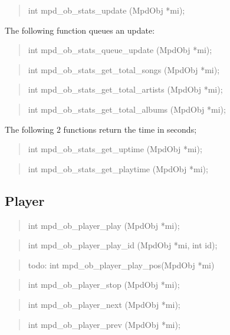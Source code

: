 \documentclass[a4paper,11pt]{article}
\begin{document}
\begin{quote}
int		mpd\_ob\_stats\_update			(MpdObj *mi);
\end{quote}

The following function queues an update:
\begin{quote}
int		mpd\_ob\_stats\_queue\_update		(MpdObj *mi);
\end{quote}

\begin{quote}
int		mpd\_ob\_stats\_get\_total\_songs		(MpdObj *mi);
\end{quote}

\begin{quote}
int		mpd\_ob\_stats\_get\_total\_artists		(MpdObj *mi);
\end{quote}

\begin{quote}
int		mpd\_ob\_stats\_get\_total\_albums		(MpdObj *mi);
\end{quote}

The following 2 functions return the time in seconds;
\begin{quote}
int		mpd\_ob\_stats\_get\_uptime			(MpdObj *mi);
\end{quote}
\begin{quote}
int		mpd\_ob\_stats\_get\_playtime		(MpdObj *mi);
\end{quote}

\subsection{Player}
\begin{quote}
int 		mpd\_ob\_player\_play			(MpdObj *mi);
\end{quote}
\begin{quote}
int 		mpd\_ob\_player\_play\_id			(MpdObj *mi, int id);
\end{quote}

\begin{quote}
todo: int mpd\_ob\_player\_play\_pos(MpdObj *mi)
\end{quote}

\begin{quote}
int 		mpd\_ob\_player\_stop			(MpdObj *mi);
\end{quote}

\begin{quote}
int 		mpd\_ob\_player\_next			(MpdObj *mi);
\end{quote}

\begin{quote}
int 		mpd\_ob\_player\_prev			(MpdObj *mi);
\end{quote}
\end{document}
